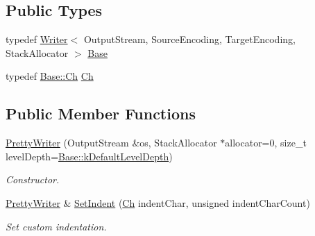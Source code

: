 \subsection*{Public Types}
\begin{DoxyCompactItemize}
\item 
typedef \hyperlink{classWriter}{Writer}$<$ Output\+Stream, Source\+Encoding, Target\+Encoding, Stack\+Allocator $>$ \hyperlink{classPrettyWriter_ab6074f4c51db129e195bc5752eb2b448}{Base}
\item 
typedef \hyperlink{classWriter_a5ba0d623162839460024b517fc2d5868}{Base\+::\+Ch} \hyperlink{classPrettyWriter_ae5f474c0f087932d795c1cb4b9d0c312}{Ch}
\end{DoxyCompactItemize}
\subsection*{Public Member Functions}
\begin{DoxyCompactItemize}
\item 
\hyperlink{classPrettyWriter_a83f9be5c5d595a08636962e4ddd27b60}{Pretty\+Writer} (Output\+Stream \&os, Stack\+Allocator $\ast$allocator=0, size\+\_\+t level\+Depth=\hyperlink{classWriter_aad47efc97708b2a64e4a0994cbbfae25}{Base\+::k\+Default\+Level\+Depth})
\begin{DoxyCompactList}\small\item\em Constructor. \end{DoxyCompactList}\item 
\hyperlink{classPrettyWriter}{Pretty\+Writer} \& \hyperlink{classPrettyWriter_afe3a560009b5cd6a79a1e91c807387ad}{Set\+Indent} (\hyperlink{classPrettyWriter_ae5f474c0f087932d795c1cb4b9d0c312}{Ch} indent\+Char, unsigned indent\+Char\+Count)
\begin{DoxyCompactList}\small\item\em Set custom indentation. \end{DoxyCompactList}\end{DoxyCompactItemize}
